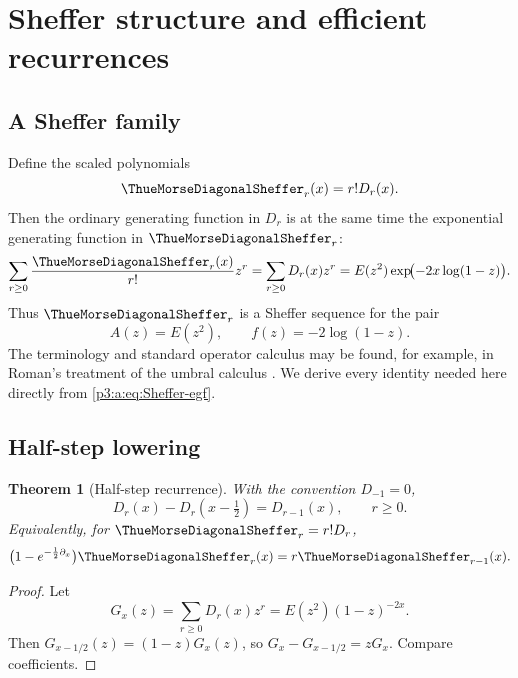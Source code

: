 \documentclass[11pt,oneside]{article}
\numberwithin{equation}{section}
\newtheorem{theorem}{Theorem}[section]
\theoremstyle{definition}
\theoremstyle{remark}
\begin{document}
\section{Sheffer structure and efficient recurrences}\label{p3:ch:sheffer}

\subsection{A Sheffer family}

Define the scaled polynomials
\begin{equation}
 \ThueMorseDiagonalSheffer_r(x)=r!D_r(x).
 \label{p3:a:eq:p-def}
\end{equation}
Then the ordinary generating function in \(D_r\) is at the same time the
exponential generating function in \(\ThueMorseDiagonalSheffer_r\):
\begin{equation}
 \sum_{r\ge0}\frac{\ThueMorseDiagonalSheffer_r(x)}{r!}z^r
 =\sum_{r\ge0}D_r(x)z^r
 =E(z^2)\exp\!\bigl(-2x\log(1-z)\bigr).
 \label{p3:a:eq:Sheffer-egf}
\end{equation}
Thus \(\ThueMorseDiagonalSheffer_r\) is a Sheffer sequence for the pair
\begin{equation}
 A(z)=E(z^2),
 \qquad
 f(z)=-2\log(1-z).
 \label{p3:a:eq:Sheffer-pair}
\end{equation}
The terminology and standard operator calculus may be found, for example, in
Roman's treatment of the umbral calculus \cite{p3:roman}.  We derive every
identity needed here directly from \eqref{p3:a:eq:Sheffer-egf}.

\subsection{Half-step lowering}

\begin{theorem}[Half-step recurrence]
With the convention \(D_{-1}=0\),
\begin{equation}
 \boxed{
 D_r(x)-D_r(x-\tfrac12)=D_{r-1}(x),
 \qquad r\ge0.}
 \label{p3:a:eq:half-step}
\end{equation}
Equivalently, for \(\ThueMorseDiagonalSheffer_r=r!D_r\),
\begin{equation}
 \bigl(1-e^{-\frac12\partial_x}\bigr)\ThueMorseDiagonalSheffer_r(x)
 =r \ThueMorseDiagonalSheffer_{r-1}(x).
 \label{p3:a:eq:delta-operator}
\end{equation}
\end{theorem}

\begin{proof}
Let
\[
 G_x(z)=\sum_{r\ge0}D_r(x)z^r
 =E(z^2)(1-z)^{-2x}.
\]
Then \(G_{x-1/2}(z)=(1-z)G_x(z)\), so
\(G_x-G_{x-1/2}=zG_x\).  Compare coefficients.
\end{proof}
\end{document}
